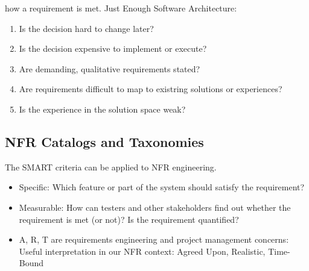 \documentclass[../Main.tex]{subfiles}
\begin{document}
how a requirement is met.
Just Enough Software Architecture:
\begin{enumerate}
    \item Is the decision hard to change later?
    \item Is the decision expensive to implement or execute?
    \item Are demanding, qualitative requirements stated?
    \item Are requirements difficult to map to existring solutions or experiences?
    \item Is the experience in the solution space weak?
\end{enumerate}

\subsection{NFR Catalogs and Taxonomies}


The SMART criteria can be applied to NFR engineering.
\begin{itemize}
    \item Specific: Which feature or part of the system should satisfy the requirement?
    \item Measurable: How can testers and other stakeholders find out whether the requirement is met (or not)? Is the requirement quantified?
    \item A, R, T are requirements engineering and project management concerns: Useful interpretation in our NFR context: Agreed Upon, Realistic, Time-Bound
\end{itemize}

\newpage
\end{document}
